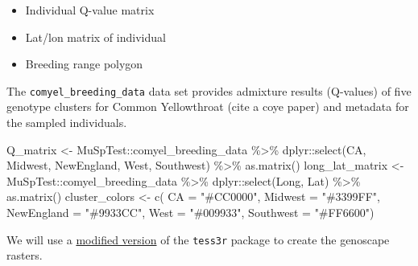 \documentclass[
]{book}
\newenvironment{Shaded}{\begin{snugshade}}{\end{snugshade}}
\newcommand{\AttributeTok}[1]{\textcolor[rgb]{0.77,0.63,0.00}{#1}}
\newcommand{\FunctionTok}[1]{\textcolor[rgb]{0.00,0.00,0.00}{#1}}
\newcommand{\NormalTok}[1]{#1}
\newcommand{\OtherTok}[1]{\textcolor[rgb]{0.56,0.35,0.01}{#1}}
\newcommand{\SpecialCharTok}[1]{\textcolor[rgb]{0.00,0.00,0.00}{#1}}
\newcommand{\StringTok}[1]{\textcolor[rgb]{0.31,0.60,0.02}{#1}}
\providecommand{\tightlist}{%
  \setlength{\itemsep}{0pt}\setlength{\parskip}{0pt}}
\begin{document}
\begin{itemize}
\tightlist
\item
  Individual Q-value matrix
\item
  Lat/lon matrix of individual
\item
  Breeding range polygon
\end{itemize}

The \texttt{comyel\_breeding\_data} data set provides admixture results (Q-values) of five genotype clusters for Common Yellowthroat (cite a coye paper) and metadata for the sampled individuals.

\begin{Shaded}
\begin{Highlighting}[]
\NormalTok{Q\_matrix }\OtherTok{\textless{}{-}}\NormalTok{ MuSpTest}\SpecialCharTok{::}\NormalTok{comyel\_breeding\_data }\SpecialCharTok{\%\textgreater{}\%}
\NormalTok{  dplyr}\SpecialCharTok{::}\FunctionTok{select}\NormalTok{(CA, Midwest, NewEngland, West, Southwest) }\SpecialCharTok{\%\textgreater{}\%}
  \FunctionTok{as.matrix}\NormalTok{()}
\NormalTok{long\_lat\_matrix }\OtherTok{\textless{}{-}}\NormalTok{ MuSpTest}\SpecialCharTok{::}\NormalTok{comyel\_breeding\_data }\SpecialCharTok{\%\textgreater{}\%}
\NormalTok{  dplyr}\SpecialCharTok{::}\FunctionTok{select}\NormalTok{(Long, Lat) }\SpecialCharTok{\%\textgreater{}\%}
  \FunctionTok{as.matrix}\NormalTok{()}
\NormalTok{cluster\_colors }\OtherTok{\textless{}{-}}  \FunctionTok{c}\NormalTok{(}
  \AttributeTok{CA =} \StringTok{"\#CC0000"}\NormalTok{,}
  \AttributeTok{Midwest =} \StringTok{"\#3399FF"}\NormalTok{,}
  \AttributeTok{NewEngland =} \StringTok{"\#9933CC"}\NormalTok{,}
  \AttributeTok{West =} \StringTok{"\#009933"}\NormalTok{,}
  \AttributeTok{Southwest =} \StringTok{"\#FF6600"}\NormalTok{) }
\end{Highlighting}
\end{Shaded}

We will use a \href{https://github.com/eriqande/TESS3_encho_sen}{modified version} of the \texttt{tess3r} package to create the genoscape rasters.
\end{document}
